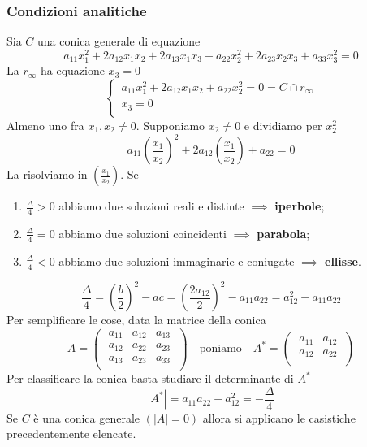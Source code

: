 \subsubsection{Condizioni analitiche}
Sia \(C\) una conica generale di equazione \[
a_{11}x_1^2+ 2a_{12}x_1x_2+2a_{13}x_1x_3+a_{22}x_2^2+2a_{23}x_2x_3+a_{33}x_3^2=0
\] 
La \(r_{\infty}\) ha equazione \(x_{3}=0\) \[
\begin{cases}
    \ a_{11}x_1^2+2a_{12}x_1x_2+a_{22}x_2^2= 0 = C \cap r_{\infty} \\
    \ x_3 = 0 \\
\end{cases}
\]
Almeno uno fra \(x_1, x_2 \neq 0\). Supponiamo \(x_2 \neq 0\) e dividiamo per \(x_2^2\) \[
a_{11} \left( \frac{x_1}{x_2} \right) ^2 + 2a_{12} \left( \frac{x_1}{x_2} \right)  + a_{22} = 0
\] 
La risolviamo in \(\left( \frac{x_1}{x_2} \right) \). Se 
\begin{enumerate}
    \item \(\frac{\Delta}{4} > 0\) abbiamo due soluzioni reali e distinte \(\implies \) \textbf{iperbole};
    \item \(\frac{\Delta}{4} = 0\) abbiamo due soluzioni coincidenti \(\implies \) \textbf{parabola};
    \item \(\frac{\Delta}{4} < 0\) abbiamo due soluzioni immaginarie e coniugate \(\implies \) \textbf{ellisse}.
\end{enumerate}

\[
\frac{\Delta}{4} = \left( \frac{b}{2} \right) ^2 - ac = \left( \frac{2a_{12}}{2} \right) ^2 - a_{11} a_{22} = a_{12}^2 - a_{11} a_{22}
\]Per semplificare le cose, data la matrice della conica \[
A = 
\left( \; \begin{matrix}
    a_{11} & a_{12} & a_{13} \\
    a_{12} & a_{22} & a_{23} \\
    a_{13} & a_{23} & a_{33} \\
\end{matrix} \; \right)
\quad \text{poniamo} \quad A^* =
\left( \; \begin{matrix}
    a_{11} & a_{12} \\
    a_{12} & a_{22} \\
\end{matrix} \; \right) \]
Per classificare la conica basta studiare il determinante di \(A^{*}\)
\[
|A^{*}| = a_{11}a_{22}-a_{12}^2= - \frac{\Delta}{4}
\] Se \(C\) è una conica generale \((|A| = 0)\) allora si applicano le casistiche precedentemente elencate.

